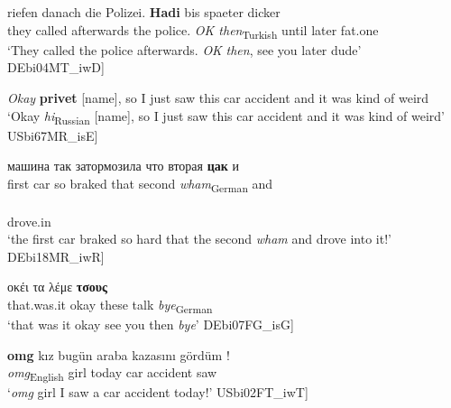 \documentclass[output=paper,colorlinks,citecolor=brown]{langscibook}
\begin{document}
\z


\ea\label{ex:ch1:ex11}

 {riefen} {danach} {die} {Polizei.} \textbf{{Hadi}} {bis} {spaeter} {dicker} \\
they called afterwards the police. \textit{OK then}\textsubscript{Turkish} until later fat.one \\
\trans ‘They called the police afterwards. \textit{OK} \textit{then}, see you later dude’ \\ \hspace{\fill}{[}DEbi04MT\_iwD{]}

\z

\ea\label{ex:ch1:ex12}
\textit{Okay} \textbf{{privet}} {[name],} {so} {I} {just} {saw} {this} {car} {accident} {and} {it} {was} {kind} {of} {weird}
\trans ‘Okay \textit{hi}\textsubscript{Russian} {[}{name}{]}, so I just saw this car accident and it was kind of weird’ \hspace{\fill}{[}USbi67MR\_isE{]}

\z

\ea\label{ex:ch1:ex13}

 {машина} {так} {затормозила} {что} {вторая} \textbf{{цак}} {и}  \\
first car so braked that second \textit{wham}\textsubscript{German} and \\
\sn {} \\
 drove.in \\
\trans ‘the first car braked so hard that the second \textit{wham} and drove into it!’ \\ \hspace{\fill}{[}DEbi18MR\_iwR{]}

\z

\ea\label{ex:ch1:ex14}

 {οκέι} {τα} {λέμε} \textbf{{τσους}} \\
that.was.it okay these talk \textit{bye}\textsubscript{German} \\
\trans ‘that was it okay see you then \textit{bye}’ \hspace{\fill}{[}DEbi07FG\_isG{]}

\z

\ea\label{ex:ch1:ex15}

\gll \textbf{{omg}} {kız} {bugün} {araba} {kazasını} {gördüm} ! \\
\textit{omg}\textsubscript{English} girl today car accident saw \\
\trans ‘\textit{omg} girl I saw a car accident today!’ \hspace{\fill}{[}USbi02FT\_iwT{]}
\end{document}
